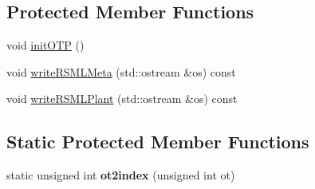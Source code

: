 \subsection*{Protected Member Functions}
\begin{DoxyCompactItemize}
\item 
void \hyperlink{classCPlantBox_1_1Plant_a81bf77f8871c255323ab42c74e67ace1}{init\+O\+TP} ()
\item 
void \hyperlink{classCPlantBox_1_1Plant_a3ccfdf7f0fb24b6b8bf21e39e6fbfbfc}{write\+R\+S\+M\+L\+Meta} (std\+::ostream \&os) const
\item 
void \hyperlink{classCPlantBox_1_1Plant_af5fcce1b9ed33b10e79dbd6e0811ff9e}{write\+R\+S\+M\+L\+Plant} (std\+::ostream \&os) const
\end{DoxyCompactItemize}
\subsection*{Static Protected Member Functions}
\begin{DoxyCompactItemize}
\item 
\mbox{\label{classCPlantBox_1_1Plant_a36d94ae6b231506f3c050a777b1fcaa8}} 
static unsigned int {\bfseries ot2index} (unsigned int ot)
\end{DoxyCompactItemize}
